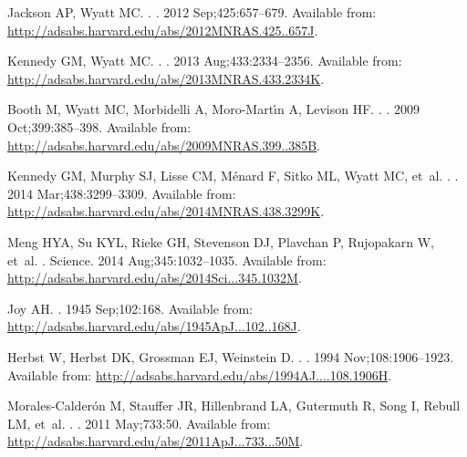 \documentclass[]{rsos}
\begin{document}
\begin{thebibliography}{10}
{Jackson} AP, {Wyatt} MC.
.
\newblock \mnras. 2012 Sep;425:657--679.
\newblock Available from:
  \url{http://adsabs.harvard.edu/abs/2012MNRAS.425..657J}.

{Kennedy} GM, {Wyatt} MC.
.
\newblock \mnras. 2013 Aug;433:2334--2356.
\newblock Available from:
  \url{http://adsabs.harvard.edu/abs/2013MNRAS.433.2334K}.

{Booth} M, {Wyatt} MC, {Morbidelli} A, {Moro-Mart{\'{\i}}n} A, {Levison} HF.
.
\newblock \mnras. 2009 Oct;399:385--398.
\newblock Available from:
  \url{http://adsabs.harvard.edu/abs/2009MNRAS.399..385B}.

{Kennedy} GM, {Murphy} SJ, {Lisse} CM, {M{\'e}nard} F, {Sitko} ML, {Wyatt} MC,
  et~al.
.
\newblock \mnras. 2014 Mar;438:3299--3309.
\newblock Available from:
  \url{http://adsabs.harvard.edu/abs/2014MNRAS.438.3299K}.

{Meng} HYA, {Su} KYL, {Rieke} GH, {Stevenson} DJ, {Plavchan} P, {Rujopakarn} W,
  et~al.
.
\newblock Science. 2014 Aug;345:1032--1035.
\newblock Available from:
  \url{http://adsabs.harvard.edu/abs/2014Sci...345.1032M}.

{Joy} AH.
\newblock \apj. 1945 Sep;102:168.
\newblock Available from:
  \url{http://adsabs.harvard.edu/abs/1945ApJ...102..168J}.

{Herbst} W, {Herbst} DK, {Grossman} EJ, {Weinstein} D.
.
\newblock \aj. 1994 Nov;108:1906--1923.
\newblock Available from:
  \url{http://adsabs.harvard.edu/abs/1994AJ....108.1906H}.

{Morales-Calder{\'o}n} M, {Stauffer} JR, {Hillenbrand} LA, {Gutermuth} R,
  {Song} I, {Rebull} LM, et~al.
.
\newblock \apj. 2011 May;733:50.
\newblock Available from:
  \url{http://adsabs.harvard.edu/abs/2011ApJ...733...50M}.


\end{thebibliography}
\end{document}
